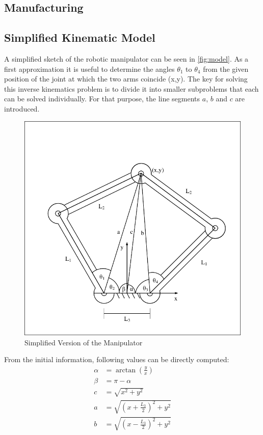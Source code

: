 \documentclass{sig-alternate-05-2015}
\begin{document}
\subsection{Manufacturing}
\subsection{Simplified Kinematic Model}\label{section1}

A simplified sketch of the robotic manipulator can be seen in  \autoref{fig:model}.
As a first approximation it is useful to determine the angles $\theta_1$ to $\theta_4$ from the given position of the joint at which the two arms coincide (x,y). The key for solving this inverse kinematics problem is to divide it into smaller subproblems that each can be solved individually. For that purpose, the line segments $a$, $b$ and $c$ are introduced.
\begin{figure}[!h]
	\centering
	\includegraphics[width=.42\textwidth]{img/LinkDiagramSimple_try.pdf}
	\caption{Simplified Version of the Manipulator}\label{fig:model}\label{fig:sketch}
\end{figure}

From the initial information, following values can be directly computed:
\begin{align*}
\alpha &= \arctan \left( \frac{y}{x} \right) \\
\beta  &= \pi - \alpha \\
c      &= \sqrt{x^2 + y^2}\\
a      &= \sqrt{\left(x+ \frac{L_3}{2}\right)^2 + y^2}\\
b      &=\sqrt{\left(x- \frac{L_3}{2}\right)^2 + y^2}
\end{align*}
\end{document}
